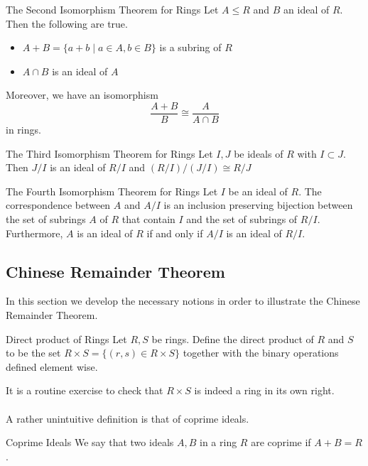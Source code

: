 \documentclass[a4paper]{article}
\begin{document}
\begin{thm}{The Second Isomorphism Theorem for Rings}{} Let $A\leq R$ and $B$ an ideal of $R$. Then the following are true. 
\begin{itemize}
\item $A+B=\{a+b\;|\;a\in A,b\in B\}$ is a subring of $R$
\item $A\cap B$ is an ideal of $A$
\end{itemize}
Moreover, we have an isomorphism $$\frac{A+B}{B}\cong\frac{A}{A\cap B}$$ in rings. 
\end{thm}

\begin{thm}{The Third Isomorphism Theorem for Rings}{} Let $I,J$ be ideals of $R$ with $I\subset J$. Then $J/I$ is an ideal of $R/I$ and $(R/I)/(J/I)\cong R/J$
\end{thm}

\begin{thm}{The Fourth Isomorphism Theorem for Rings}{} Let $I$ be an ideal of $R$. The correspondence between $A$ and $A/I$ is an inclusion preserving bijection between the set of subrings $A$ of $R$ that contain $I$ and the set of subrings of $R/I$. Furthermore, $A$ is an ideal of $R$ if and only if $A/I$ is an ideal of $R/I$. 
\end{thm}

\subsection{Chinese Remainder Theorem}
In this section we develop the necessary notions in order to illustrate the Chinese Remainder Theorem. 

\begin{defn}{Direct product of Rings}{} Let $R,S$ be rings. Define the direct product of $R$ and $S$ to be the set $R\times S=\{(r,s)\in R\times S\}$ together with the binary operations defined element wise. 
\end{defn}

It is a routine exercise to check that $R\times S$ is indeed a ring in its own right. \\~\\

A rather unintuitive definition is that of coprime ideals. 

\begin{defn}{Coprime Ideals}{} We say that two ideals $A,B$ in a ring $R$ are coprime if $A+B=R$. 
\end{defn}
\end{document}
